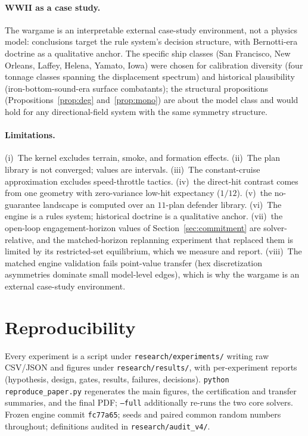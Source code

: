 \documentclass[12pt,a4paper]{article}
\begin{document}
\paragraph{WWII as a case study.}  The wargame is an interpretable
external case-study environment, not a physics model: conclusions target the rule
system's decision structure, with Bernotti-era doctrine as a qualitative
anchor.  The specific ship classes (San Francisco, New Orleans, Laffey,
Helena, Yamato, Iowa) were chosen for calibration diversity (four tonnage
classes spanning the displacement spectrum) and historical plausibility
(iron-bottom-sound-era surface combatants); the structural propositions
(Propositions~\ref{prop:deg} and~\ref{prop:mono}) are about the
model class and would hold for any directional-field system with the same
symmetry structure.

\paragraph{Limitations.}  (i)~The kernel excludes terrain, smoke, and
formation effects.  (ii)~The plan library is not converged; values are
intervals.  (iii)~The constant-cruise approximation excludes
speed-throttle tactics.  (iv)~the direct-hit contrast comes from one
geometry with zero-variance low-hit expectancy ($1/12$).  (v)~the
no-guarantee landscape is computed over an $11$-plan defender library.  (vi)~The
engine is a rules system; historical doctrine is a qualitative anchor.
(vii)~the open-loop engagement-horizon values of Section~\ref{sec:commitment} are solver-relative, and the matched-horizon replanning experiment that replaced them is limited by its restricted-set equilibrium, which we measure and report.  (viii)~The matched engine validation fails point-value
transfer (hex discretization asymmetries dominate small model-level
edges), which is why the wargame is an external case-study environment.

\section{Reproducibility}\label{sec:repro}
Every experiment is a script under \texttt{research/experiments/}
writing raw CSV/JSON and figures under \texttt{research/results/}, with
per-experiment reports (hypothesis, design, gates, results, failures,
decisions).  \texttt{python reproduce\_paper.py} regenerates the main
figures, the certification and transfer summaries, and the final PDF;
\texttt{--full} additionally re-runs the two core solvers.  Frozen engine commit \texttt{fc77a65}; seeds and paired
common random numbers throughout; definitions audited in
\texttt{research/audit\_v4/}.
\end{document}

